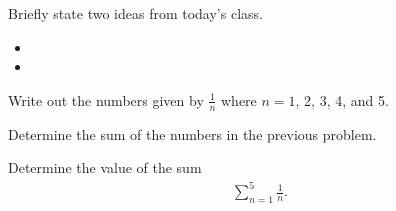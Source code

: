 \postClass

\begin{problem}
\item Briefly state two ideas from today's class.
  \begin{itemize}
  \item
  \item
  \end{itemize}
\item
  \begin{subproblem}
    \item
  \end{subproblem}
\end{problem}





\begin{problem}
  \item Write out the numbers given by $\frac{1}{n}$ where $n=1$,
    2, 3, 4, and 5.
    \vfill
  \item Determine the sum of the numbers in the previous problem.
    \vfill
  \item Determine the value of the sum
    \begin{eqnarray*}
      \sum_{n=1}^{5} \frac{1}{n}.
    \end{eqnarray*}
\end{problem}



